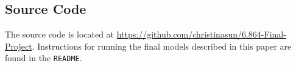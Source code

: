 \documentclass[11pt,a4paper]{article}
\begin{document}
\subsection*{Source Code}
The source code is located at \url{https://github.com/christinasun/6.864-Final-Project}. Instructions for running the final models described in this paper are found in the \texttt{README}. 

\nocite{*}


\end{document}
